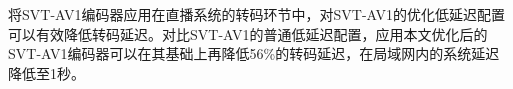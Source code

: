 将SVT-AV1编码器应用在直播系统的转码环节中，对SVT-AV1的优化低延迟配置可以有效降低转码延迟。对比SVT-AV1的普通低延迟配置，应用本文优化后的SVT-AV1编码器可以在其基础上再降低56\%的转码延迟，在局域网内的系统延迟降低至1秒。

%
%
%
%

